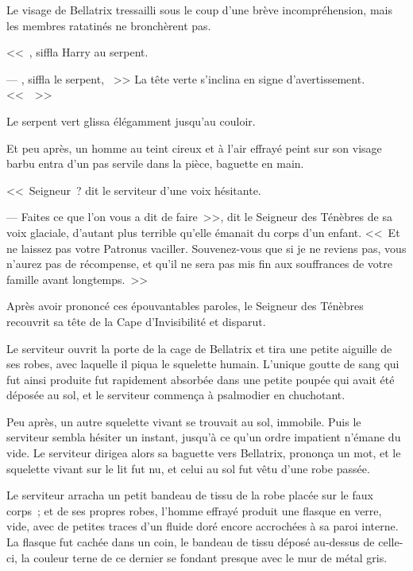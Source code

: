 Le visage de Bellatrix tressailli sous le coup d'une brève incompréhension, mais les membres ratatinés ne bronchèrent pas.

<<~, siffla Harry au serpent. 

--- , siffla le serpent, ~>> La tête verte s'inclina en signe d'avertissement. <<~~>>

Le serpent vert glissa élégamment jusqu'au couloir.

Et peu après, un homme au teint cireux et à l'air effrayé peint sur son visage barbu entra d'un pas servile dans la pièce, baguette en main.

<<~Seigneur~? dit le serviteur d'une voix hésitante.

--- Faites ce que l'on vous a dit de faire~>>, dit le Seigneur des Ténèbres de sa voix glaciale, d'autant plus terrible qu'elle émanait du corps d'un enfant. <<~Et ne laissez pas votre Patronus vaciller. Souvenez-vous que si je ne reviens pas, vous n'aurez pas de récompense, et qu'il ne sera pas mis fin aux souffrances de votre famille avant longtemps.~>>

Après avoir prononcé ces épouvantables paroles, le Seigneur des Ténèbres recouvrit sa tête de la Cape d'Invisibilité et disparut.

Le serviteur ouvrit la porte de la cage de Bellatrix et tira une petite aiguille de ses robes, avec laquelle il piqua le squelette humain. L'unique goutte de sang qui fut ainsi produite fut rapidement absorbée dans une petite poupée qui avait été déposée au sol, et le serviteur commença à psalmodier en chuchotant.

Peu après, un autre squelette vivant se trouvait au sol, immobile. Puis le serviteur sembla hésiter un instant, jusqu'à ce qu'un ordre impatient n'émane du vide. Le serviteur dirigea alors sa baguette vers Bellatrix, prononça un mot, et le squelette vivant sur le lit fut nu, et celui au sol fut vêtu d'une robe passée.

Le serviteur arracha un petit bandeau de tissu de la robe placée sur le faux corps~; et de ses propres robes, l'homme effrayé produit une flasque en verre, vide, avec de petites traces d'un fluide doré encore accrochées à sa paroi interne. La flasque fut cachée dans un coin, le bandeau de tissu déposé au-dessus de celle-ci, la couleur terne de ce dernier se fondant presque avec le mur de métal gris.

